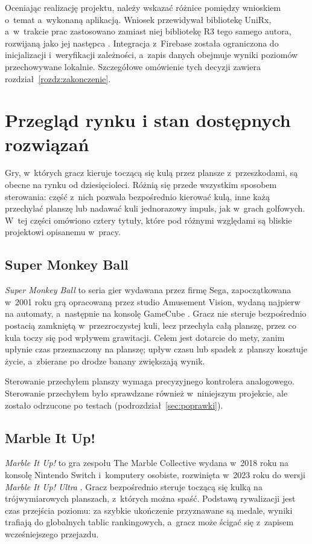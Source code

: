 Oceniając realizację projektu, należy wskazać różnice pomiędzy wnioskiem o~temat a~wykonaną
aplikacją. Wniosek przewidywał bibliotekę UniRx, a~w~trakcie prac zastosowano zamiast niej
bibliotekę R3 tego samego autora, rozwijaną jako jej następca \cite{r3,unirx}. Integracja
z~Firebase została ograniczona do inicjalizacji i~weryfikacji
zależności, a~zapis danych obejmuje wyniki poziomów przechowywane lokalnie. Szczegółowe
omówienie tych decyzji zawiera rozdział~\ref{rozdz:zakonczenie}.

\section{Przegląd rynku i stan dostępnych rozwiązań}

Gry, w~których gracz kieruje toczącą się kulą przez plansze z~przeszkodami, są obecne na
rynku od dziesięcioleci. Różnią się przede wszystkim sposobem sterowania: część z~nich
pozwala bezpośrednio kierować kulą, inne każą przechylać planszę lub nadawać kuli
jednorazowy impuls, jak w~grach golfowych. W~tej części omówiono cztery tytuły, które pod
różnymi względami są bliskie projektowi opisanemu w~pracy.

\subsection{Super Monkey Ball}

\emph{Super Monkey Ball} to seria gier wydawana przez firmę Sega, zapoczątkowana w~2001
roku grą opracowaną przez studio Amusement Vision, wydaną najpierw na automaty, a~następnie
na konsolę GameCube \cite{gra-smb}. Gracz nie steruje bezpośrednio postacią zamkniętą
w~przezroczystej kuli, lecz przechyla całą planszę, przez co kula toczy się pod wpływem
grawitacji. Celem jest dotarcie do mety, zanim upłynie czas przeznaczony na planszę;
upływ czasu lub spadek z~planszy kosztuje życie, a~zbierane po drodze banany zwiększają
wynik.

Sterowanie przechyłem planszy wymaga precyzyjnego kontrolera analogowego.
Sterowanie przechyłem było sprawdzane również w~niniejszym projekcie, ale zostało
odrzucone po testach (podrozdział~\ref{sec:poprawki}).

\subsection{Marble It Up!}

\emph{Marble It Up!} to gra zespołu The Marble Collective wydana w~2018 roku na konsolę
Nintendo Switch i~komputery osobiste, rozwinięta w~2023 roku do wersji \emph{Marble It Up!
Ultra} \cite{gra-miu}. Gracz bezpośrednio steruje toczącą się kulką na trójwymiarowych
planszach, z~których można spaść. Podstawą rywalizacji jest czas przejścia poziomu: za
szybkie ukończenie przyznawane są medale, wyniki trafiają do globalnych tablic
rankingowych, a~gracz może ścigać się z~zapisem wcześniejszego przejazdu.

